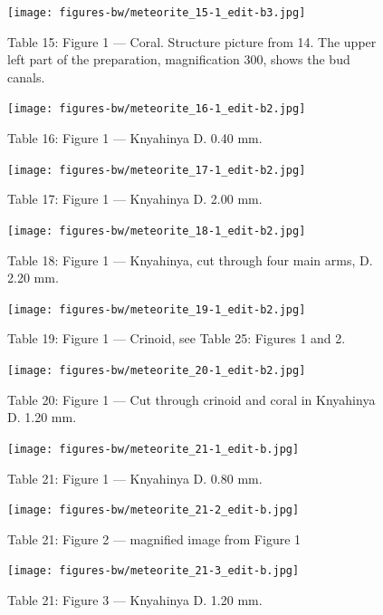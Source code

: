 \documentclass[a4paper, 12pt, oneside]{article}
\begin{document}
\clearpage
{}
\begin{figure}[t]
\texttt{[image: figures-bw/meteorite\_15-1\_edit-b3.jpg]}
\caption{Table 15: Figure 1 --- Coral. Structure picture from 14. The upper left part of the preparation, magnification 300, shows the bud canals.}
\centering
\end{figure}
\clearpage
{}
\begin{figure}[t]
\texttt{[image: figures-bw/meteorite\_16-1\_edit-b2.jpg]}
\caption{Table 16: Figure 1 --- Knyahinya D. 0.40 mm.}
\centering
\end{figure}
\clearpage
{}
\begin{figure}[t]
\texttt{[image: figures-bw/meteorite\_17-1\_edit-b2.jpg]}
\caption{Table 17: Figure 1 --- Knyahinya D. 2.00 mm.}
\centering
\end{figure}
\clearpage
{}
\begin{figure}[t]
\texttt{[image: figures-bw/meteorite\_18-1\_edit-b2.jpg]}
\caption{Table 18: Figure 1 --- Knyahinya, cut through four main arms, D. 2.20 mm.}
\centering
\end{figure}
\clearpage
{}
\begin{figure}[t]
\texttt{[image: figures-bw/meteorite\_19-1\_edit-b2.jpg]}
\caption{Table 19: Figure 1 --- Crinoid, see Table 25: Figures 1 and 2.}
\centering
\end{figure}
\clearpage
{}
\begin{figure}[t]
\texttt{[image: figures-bw/meteorite\_20-1\_edit-b2.jpg]}
\caption{Table 20: Figure 1 --- Cut through crinoid and coral in Knyahinya D. 1.20 mm.}
\centering
\end{figure}
\clearpage
{}
\begin{figure}[t]
\texttt{[image: figures-bw/meteorite\_21-1\_edit-b.jpg]}
\caption{Table 21: Figure 1 --- Knyahinya D. 0.80 mm.}
\centering
\end{figure}
\clearpage
\begin{figure}[t]
\texttt{[image: figures-bw/meteorite\_21-2\_edit-b.jpg]}
\caption{Table 21: Figure 2 --- magnified image from Figure 1}
\centering
\end{figure}
\clearpage
\begin{figure}[t]
\texttt{[image: figures-bw/meteorite\_21-3\_edit-b.jpg]}
\caption{Table 21: Figure 3 --- Knyahinya D. 1.20 mm.}
\centering
\end{figure}
\end{document}

